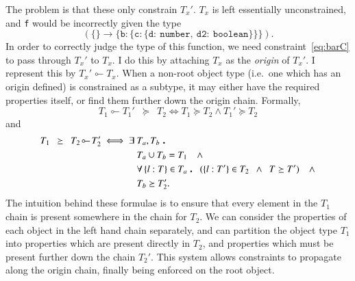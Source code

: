 \documentclass[12pt,a4paper,twoside,openright]{report}
\theoremstyle{definition}
\theoremstyle{dotless}
\newcommand*{\js}{\texttt}
\newcommand*{\orig}{\ensuremath{\!\multimapinv\!}}
\newcommand\qdot{\mathbin{\scalebox{1.5}{.}}\enspace}
\begin{document}
The problem is that these only constrain $T_x'$. $T_x$ is
left essentially unconstrained, and \js{f} would be incorrectly given the type
$$\mathtt{(\mathtt{\{\} \rightarrow \{b:\{c:\{d:\ number,\ d2:\ boolean\}\}\}})}.$$ In order to
correctly judge the type of this function, we need constraint~\eqref{eq:barC}
to pass through $T_x'$ to $T_x$. I do this by attaching $T_x$ as the
\textit{origin} of $T_x'$. I represent this by $T_x'\orig T_x$. When a
non-root object type (i.e.~one which has an origin defined) is constrained as a
subtype, it may either have the required properties itself, or find them
further down the origin chain. Formally,
\begin{equation}
  T_1\orig T_1'\enspace \succeq \enspace T_2 \iff T_1\succeq T_2 \land T_1' \succeq T_2
\end{equation}
and
\begin{equation}
  \begin{split}
	T_1\enspace \succeq\enspace T_2\orig T_2' \iff \exists\ & T_a, T_b\ \qdot\\
	& T_a\cup T_b = T_1 \quad\land \\
	& \forall \left\{l: T\right\} \in T_a \qdot (\{l: T'\}\in T_2\enspace \land \enspace T \succeq T') \quad\land \\
	& T_b \succeq T_2'.
  \end{split}
  \label{succeq}
\end{equation}
The intuition behind these formulae is to ensure that every element in the
$T_1$ chain is present somewhere in the chain for $T_2$.  We can consider the
properties of each object in the left hand chain separately, and can partition
the object type $T_1$ into properties which are present directly in $T_2$, and
properties which must be present further down the chain $T_2'$.
This system allows constraints to propagate along the origin chain, finally
being enforced on the root object.
\end{document}
